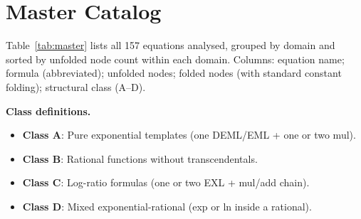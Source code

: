 \documentclass[12pt,a4paper]{article}
\theoremstyle{definition}
\begin{document}
\section{Master Catalog}
\label{sec:catalog}

Table~\ref{tab:master} lists all 157 equations analysed, grouped by domain
and sorted by unfolded node count within each domain.
Columns: equation name; formula (abbreviated); unfolded nodes; folded nodes
(with standard constant folding); structural class (A--D).

\textbf{Class definitions.}
\begin{itemize}[noitemsep]
\item \textbf{Class A}: Pure exponential templates (one DEML/EML + one or two mul).
\item \textbf{Class B}: Rational functions without transcendentals.
\item \textbf{Class C}: Log-ratio formulas (one or two EXL + mul/add chain).
\item \textbf{Class D}: Mixed exponential-rational (exp or ln inside a rational).
\end{itemize}
\end{document}
